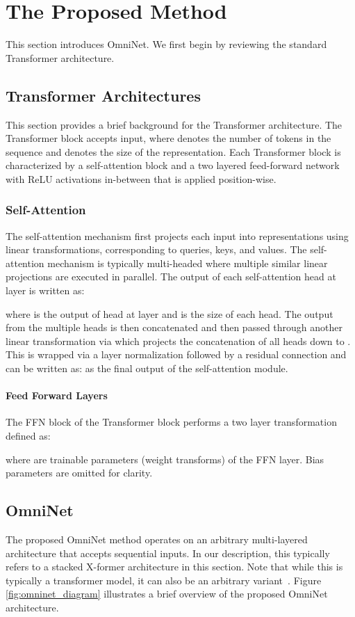 \documentclass{article}
\begin{document}
\section{The Proposed Method}
This section introduces OmniNet. We first begin by reviewing the standard Transformer architecture. 
\subsection{Transformer Architectures}
This section provides a brief background for the Transformer architecture. The Transformer block accepts  input, where  denotes the number of tokens in the sequence and  denotes the size of the representation. Each Transformer block is characterized by a self-attention block and a two layered feed-forward network with ReLU activations in-between that is applied position-wise. 
\subsubsection{Self-Attention}
The self-attention mechanism first projects each input  into  representations using linear transformations, corresponding to queries, keys, and values. The self-attention mechanism is typically multi-headed where multiple similar linear projections are executed in parallel. The output of each self-attention head  at layer  is written as:

where  is the output of head  at layer  and  is the size of each head. The output from the multiple heads is then concatenated and then passed through another linear transformation via  which projects the concatenation of all heads down to . This is wrapped via a layer normalization followed by a residual connection and can be written as:  as the final output of the self-attention module. 
\vspace{-5pt}
\paragraph{Feed Forward Layers} The FFN block of the Transformer block performs a two layer transformation defined as:

where  are trainable parameters (weight transforms) of the FFN layer. Bias parameters are omitted for clarity.
\subsection{OmniNet}


The proposed OmniNet method operates on an arbitrary multi-layered architecture that accepts sequential inputs. In our description, this typically refers to a stacked X-former architecture in this section. Note that while this is typically a transformer model, it can also be an arbitrary variant~\citep{choromanski2020rethinking,wang2020linformer}. Figure \ref{fig:omninet_diagram} illustrates a brief overview of the proposed OmniNet architecture.
\end{document}
